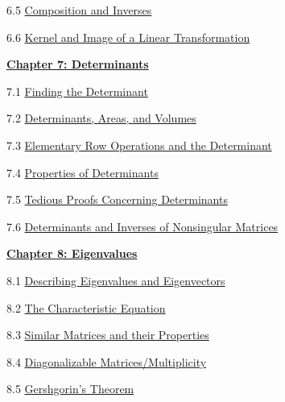 \documentclass{ximera}
\begin{document}
6.5	\href{https://ximera.osu.edu/linearalgebradzv3/LinearAlgebraInteractiveIntro/LTR-0030/main}{Composition and Inverses}
	
6.6	\href{https://ximera.osu.edu/linearalgebradzv3/LinearAlgebraInteractiveIntro/LTR-0050/main}{Kernel and Image of a Linear Transformation}
		
\href{https://ximera.osu.edu/linearalgebradzv3/LinearAlgebraInteractiveIntro/XLAChapter_det/main}{\textbf{Chapter 7: Determinants}}
	
7.1	\href{https://ximera.osu.edu/linearalgebradzv3/LinearAlgebraInteractiveIntro/DET-0010/main}{Finding the Determinant}
	
7.2	\href{https://ximera.osu.edu/linearalgebradzv3/LinearAlgebraInteractiveIntro/DET-0070/main}{Determinants, Areas, and Volumes}
	
7.3	\href{https://ximera.osu.edu/linearalgebradzv3/LinearAlgebraInteractiveIntro/DET-0030/main}{Elementary Row Operations and the Determinant}
	
7.4	\href{https://ximera.osu.edu/linearalgebradzv3/LinearAlgebraInteractiveIntro/DET-0040/main}{Properties of Determinants}
	
7.5	\href{https://ximera.osu.edu/linearalgebradzv3/LinearAlgebraInteractiveIntro/DET-0050/main}{Tedious Proofs Concerning Determinants}
	
7.6	\href{https://ximera.osu.edu/linearalgebradzv3/LinearAlgebraInteractiveIntro/DET-0060/main}{Determinants and Inverses of Nonsingular Matrices}
		
\href{https://ximera.osu.edu/linearalgebradzv3/LinearAlgebraInteractiveIntro/XLAChapter_eigenvalues/main}{\textbf{Chapter 8: Eigenvalues}}
	
8.1	\href{https://ximera.osu.edu/linearalgebradzv3/LinearAlgebraInteractiveIntro/EIG-0010/main}{Describing Eigenvalues and Eigenvectors}
	
8.2	\href{https://ximera.osu.edu/linearalgebradzv3/LinearAlgebraInteractiveIntro/EIG-0020/main}{The Characteristic Equation}
	
8.3	\href{https://ximera.osu.edu/linearalgebradzv3/LinearAlgebraInteractiveIntro/EIG-0040/main}{Similar Matrices and their Properties}
	
8.4	\href{https://ximera.osu.edu/linearalgebradzv3/LinearAlgebraInteractiveIntro/EIG-0050/main}{Diagonalizable Matrices/Multiplicity}
	
8.5	\href{https://ximera.osu.edu/linearalgebradzv3/LinearAlgebraInteractiveIntro/EIG-0080/main}{Gershgorin's Theorem}
	
\end{document}
